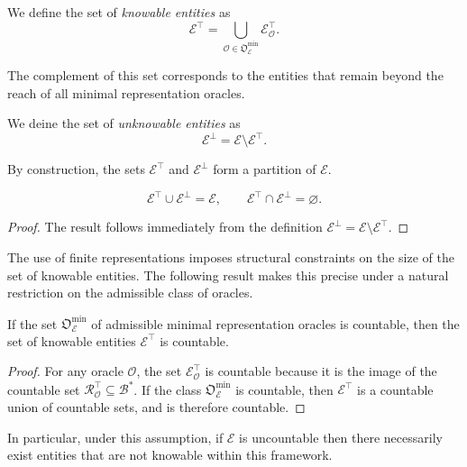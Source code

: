 \begin{definition}
We define the set of \emph{knowable entities} as
\[
\mathcal{E}^{\top} = \bigcup_{\mathcal{O}\in\mathfrak{O}_{\mathcal{E}}^{\min}} \mathcal{E}_{\mathcal{O}}^{\top}.
\]
\end{definition}

The complement of this set corresponds to the entities that remain beyond the reach of all minimal representation oracles.

\begin{definition}
We deine the set of \emph{unknowable entities} as
\[
\mathcal{E}^{\bot} = \mathcal{E} \setminus \mathcal{E}^{\top}.
\]
\end{definition}

By construction, the sets $\mathcal{E}^{\top}$ and $\mathcal{E}^{\bot}$ form a partition of $\mathcal{E}$.

\begin{proposition}
\[
\mathcal{E}^{\top} \cup \mathcal{E}^{\bot} = \mathcal{E}, \qquad \mathcal{E}^{\top} \cap \mathcal{E}^{\bot} = \varnothing.
\]
\end{proposition}
\begin{proof}
The result follows immediately from the definition $\mathcal{E}^{\bot}=\mathcal{E}\setminus\mathcal{E}^{\top}$.
\end{proof}

The use of finite representations imposes structural constraints on the size of the set of knowable entities. The following result makes this precise under a natural restriction on the admissible class of oracles.

\begin{proposition}
If the set $\mathfrak{O}_{\mathcal{E}}^{\min}$ of admissible minimal representation oracles is countable, then the set of knowable entities $\mathcal{E}^{\top}$ is countable.
\end{proposition}
\begin{proof}
For any oracle $\mathcal{O}$, the set $\mathcal{E}_{\mathcal{O}}^{\top}$ is countable because it is the image of the countable set $\mathcal{R}_{\mathcal{O}}^{\top}\subseteq\mathcal{B}^\ast$. If the class $\mathfrak{O}_{\mathcal{E}}^{\min}$ is countable, then $\mathcal{E}^{\top}$ is a countable union of countable sets, and is therefore countable.
\end{proof}

In particular, under this assumption, if $\mathcal{E}$ is uncountable then there necessarily exist entities that are not knowable within this framework.

